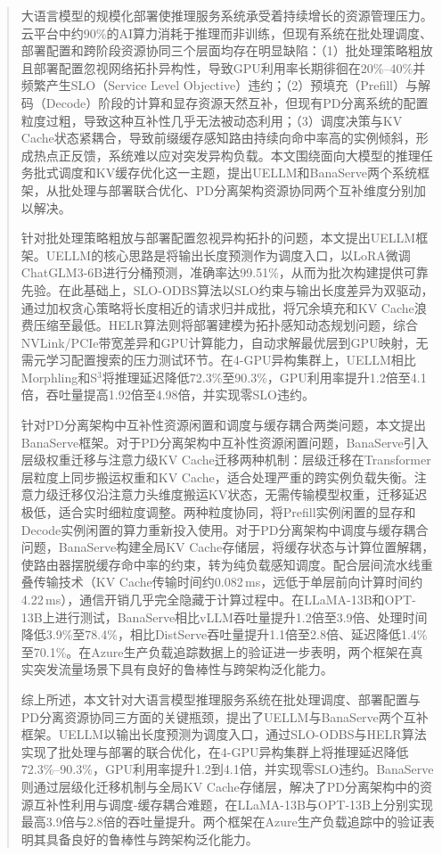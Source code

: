 
\begin{abstract}
  大语言模型的规模化部署使推理服务系统承受着持续增长的资源管理压力。云平台中约90\%的AI算力消耗于推理而非训练，但现有系统在批处理调度、部署配置和跨阶段资源协同三个层面均存在明显缺陷：（1）批处理策略粗放且部署配置忽视网络拓扑异构性，导致GPU利用率长期徘徊在20\%--40\%并频繁产生SLO（Service Level Objective）违约；（2）预填充（Prefill）与解码（Decode）阶段的计算和显存资源天然互补，但现有PD分离系统的配置粒度过粗，导致这种互补性几乎无法被动态利用；（3）调度决策与KV Cache状态紧耦合，导致前缀缓存感知路由持续向命中率高的实例倾斜，形成热点正反馈，系统难以应对突发异构负载。本文围绕面向大模型的推理任务批式调度和KV缓存优化这一主题，提出UELLM和BanaServe两个系统框架，从批处理与部署联合优化、PD分离架构资源协同两个互补维度分别加以解决。

  针对批处理策略粗放与部署配置忽视异构拓扑的问题，本文提出UELLM框架。UELLM的核心思路是将输出长度预测作为调度入口，以LoRA微调ChatGLM3-6B进行分桶预测，准确率达99.51\%，从而为批次构建提供可靠先验。在此基础上，SLO-ODBS算法以SLO约束与输出长度差异为双驱动，通过加权贪心策略将长度相近的请求归并成批，将冗余填充和KV Cache浪费压缩至最低。HELR算法则将部署建模为拓扑感知动态规划问题，综合NVLink/PCIe带宽差异和GPU计算能力，自动求解最优层到GPU映射，无需元学习配置搜索的压力测试环节。在4-GPU异构集群上，UELLM相比Morphling和S$^3$将推理延迟降低72.3\%至90.3\%，GPU利用率提升1.2倍至4.1倍，吞吐量提高1.92倍至4.98倍，并实现零SLO违约。

  针对PD分离架构中互补性资源闲置和调度与缓存耦合两类问题，本文提出BanaServe框架。对于PD分离架构中互补性资源闲置问题，BanaServe引入层级权重迁移与注意力级KV Cache迁移两种机制：层级迁移在Transformer层粒度上同步搬运权重和KV Cache，适合处理严重的跨实例负载失衡。注意力级迁移仅沿注意力头维度搬运KV状态，无需传输模型权重，迁移延迟极低，适合实时细粒度调整。两种粒度协同，将Prefill实例闲置的显存和Decode实例闲置的算力重新投入使用。对于PD分离架构中调度与缓存耦合问题，BanaServe构建全局KV Cache存储层，将缓存状态与计算位置解耦，使路由器摆脱缓存命中率的约束，转为纯负载感知调度。配合层间流水线重叠传输技术（KV Cache传输时间约0.082\,ms，远低于单层前向计算时间约4.22\,ms），通信开销几乎完全隐藏于计算过程中。在LLaMA-13B和OPT-13B上进行测试，BanaServe相比vLLM吞吐量提升1.2倍至3.9倍、处理时间降低3.9\%至78.4\%，相比DistServe吞吐量提升1.1倍至2.8倍、延迟降低1.4\%至70.1\%。在Azure生产负载追踪数据上的验证进一步表明，两个框架在真实突发流量场景下具有良好的鲁棒性与跨架构泛化能力。

  综上所述，本文针对大语言模型推理服务系统在批处理调度、部署配置与PD分离资源协同三方面的关键瓶颈，提出了UELLM与BanaServe两个互补框架。UELLM以输出长度预测为调度入口，通过SLO-ODBS与HELR算法实现了批处理与部署的联合优化，在4-GPU异构集群上将推理延迟降低72.3\%–90.3\%，GPU利用率提升1.2到4.1倍，并实现零SLO违约。BanaServe则通过层级化迁移机制与全局KV Cache存储层，解决了PD分离架构中的资源互补性利用与调度-缓存耦合难题，在LLaMA-13B与OPT-13B上分别实现最高3.9倍与2.8倍的吞吐量提升。两个框架在Azure生产负载追踪中的验证表明其具备良好的鲁棒性与跨架构泛化能力。

\end{abstract}

